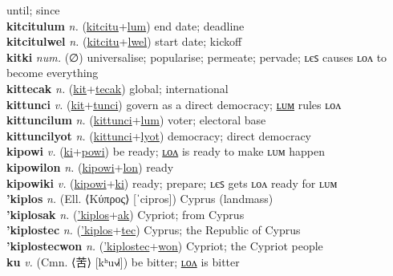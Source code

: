 until; since \label{kitcitulon} \\
\textbf{kitcitulum} \textit{n.} (\hyperref[kitcitu]{kitcitu}+\hyperref[lum]{lum})
end date; deadline \label{kitcitulum} \\
\textbf{kitcitulwel} \textit{n.} (\hyperref[kitcitu]{kitcitu}+\hyperref[lwel]{lwel})
start date; kickoff \label{kitcitulwel} \\
\textbf{kitki} \textit{num.} (∅)
universalise; popularise; permeate; pervade; ʟєꜱ causes ʟᴏᴧ to become everything \label{kitki} \\
\textbf{kittecak} \textit{n.} (\hyperref[kit]{kit}+\hyperref[tecak]{tecak})
global; international \label{kittecak} \\
\textbf{kittunci} \textit{v.} (\hyperref[kit]{kit}+\hyperref[tunci]{tunci})
govern as a direct democracy; \hyperref[kittuncilum]{ʟᴜᴍ} rules ʟᴏᴧ \label{kittunci} \\
\textbf{kittuncilum} \textit{n.} (\hyperref[kittunci]{kittunci}+\hyperref[lum]{lum})
voter; electoral base \label{kittuncilum} \\
\textbf{kittuncilyot} \textit{n.} (\hyperref[kittunci]{kittunci}+\hyperref[lyot]{lyot})
democracy; direct democracy \label{kittuncilyot} \\
\textbf{kipowi} \textit{v.} (\hyperref[ki]{ki}+\hyperref[powi]{powi})
be ready; \hyperref[kipowilon]{ʟᴏᴧ} is ready to make ʟᴜᴍ happen \label{kipowi} \\
\textbf{kipowilon} \textit{n.} (\hyperref[kipowi]{kipowi}+\hyperref[lon]{lon})
ready \label{kipowilon} \\
\textbf{kipowiki} \textit{v.} (\hyperref[kipowi]{kipowi}+\hyperref[ki]{ki})
ready; prepare; ʟєꜱ gets ʟᴏᴧ ready for ʟᴜᴍ \label{kipowiki} \\
\textbf{'kiplos} \textit{n.} (Ell. ⟨Κύπρος⟩ [ˈcipros])
Cyprus (landmass) \label{'kiplos} \\
\textbf{'kiplosak} \textit{n.} (\hyperref['kiplos]{'kiplos}+\hyperref[ak]{ak})
Cypriot; from Cyprus \label{'kiplosak} \\
\textbf{'kiplostec} \textit{n.} (\hyperref['kiplos]{'kiplos}+\hyperref[tec]{tec})
Cyprus; the Republic of Cyprus \label{'kiplostec} \\
\textbf{'kiplostecwon} \textit{n.} (\hyperref['kiplostec]{'kiplostec}+\hyperref[won]{won})
Cypriot; the Cypriot people \label{'kiplostecwon} \\
\textbf{ku} \textit{v.} (Cmn. ⟨苦⟩ [kʰu˧˩˧])
be bitter; \hyperref[kulon]{ʟᴏᴧ} is bitter \label{ku} \\
